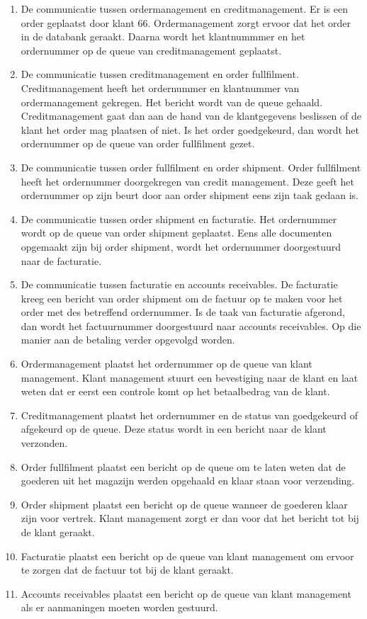 \begin{enumerate}
	\item De communicatie tussen ordermanagement en creditmanagement. Er is een order geplaatst door klant 66. Ordermanagement zorgt ervoor dat het order in de databank geraakt. Daarna wordt het klantnummmer en het ordernummer op de queue van creditmanagement geplaatst. 
	\item De communicatie tussen creditmanagement en order fullfilment. Creditmanagement heeft het ordernummer en klantnummer van ordermanagement gekregen. Het bericht wordt van de queue gehaald. Creditmanagement gaat dan aan de hand van de klantgegevens beslissen of de klant het order mag plaatsen of niet. Is het order goedgekeurd, dan wordt het ordernummer op de queue van order fullfilment gezet.
	\item De communicatie tussen order fullfilment en order shipment. Order fullfilment heeft het ordernummer doorgekregen van credit management. Deze geeft het ordernummer op zijn beurt door aan order shipment eens zijn taak gedaan is. 
	\item De communicatie tussen order shipment en facturatie. Het ordernummer wordt op de queue van order shipment geplaatst. Eens alle documenten opgemaakt zijn bij order shipment, wordt het ordernummer doorgestuurd naar de facturatie.
	\item De communicatie tussen facturatie en accounts receivables. De facturatie kreeg een bericht van order shipment om de factuur op te maken voor het order met des betreffend ordernummer. Is de taak van facturatie afgerond, dan wordt het factuurnummer doorgestuurd naar accounts receivables. Op die manier aan de betaling verder opgevolgd worden.
	\item Ordermanagement plaatst het ordernummer op de queue van klant management. Klant management stuurt een bevestiging naar de klant en laat weten dat er eerst een controle komt op het betaalbedrag van de klant.
	\item Creditmanagement plaatst het ordernummer en de status van goedgekeurd of afgekeurd op de queue. Deze status wordt in een bericht naar de klant verzonden. 
	\item Order fullfilment plaatst een bericht op de queue om te laten weten dat de goederen uit het magazijn werden opgehaald en klaar staan voor verzending.
	\item Order shipment plaatst een bericht op de queue wanneer de goederen klaar zijn voor vertrek. Klant management zorgt er dan voor dat het bericht tot bij de klant geraakt.
	\item Facturatie plaatst een bericht op de queue van klant management om ervoor te zorgen dat de factuur tot bij de klant geraakt.
	\item Accounts receivables plaatst een bericht op de queue van klant management als er aanmaningen moeten worden gestuurd.
\end{enumerate}


